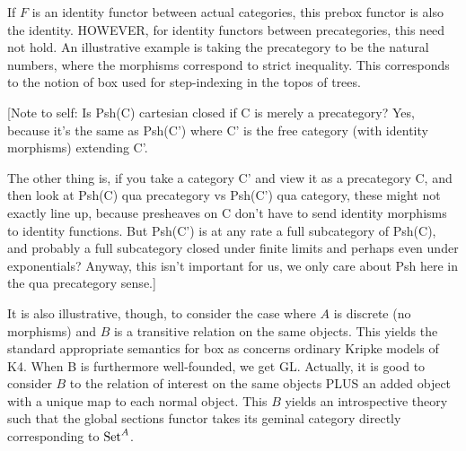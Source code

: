 \begin{TODOblock}
If $F$ is an identity functor between actual categories, this prebox functor is also the identity. HOWEVER, for identity functors between precategories, this need not hold. An illustrative example is taking the precategory to be the natural numbers, where the morphisms correspond to strict inequality. This corresponds to the notion of box used for step-indexing in the topos of trees.

[Note to self: Is Psh(C) cartesian closed if C is merely a precategory? Yes, because it's the same as Psh(C') where C' is the free category (with identity morphisms) extending C'.

The other thing is, if you take a category C' and view it as a precategory C, and then look at Psh(C) qua precategory vs Psh(C') qua category, these might not exactly line up, because presheaves on C don't have to send identity morphisms to identity functions. But Psh(C') is at any rate a full subcategory of Psh(C), and probably a full subcategory closed under finite limits and perhaps even under exponentials? Anyway, this isn't important for us, we only care about Psh here in the qua precategory sense.]

It is also illustrative, though, to consider the case where $A$ is discrete (no morphisms) and $B$ is a transitive relation on the same objects. This yields the standard appropriate semantics for box as concerns ordinary Kripke models of K4. When B is furthermore well-founded, we get GL. Actually, it is good to consider $B$ to the relation of interest on the same objects PLUS an added object with a unique map to each normal object. This $B$ yields an introspective theory such that the global sections functor takes its geminal category directly corresponding to $\mathrm{Set}^A$.
\end{TODOblock}

